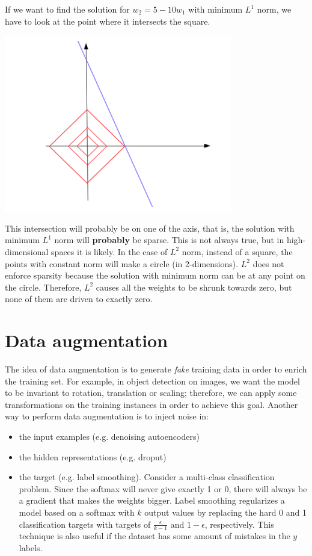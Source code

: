 If we want to find the solution for $w_2 = 5 - 10 w_1$ with minimum $L^1$ norm, we have to look at the point where it intersects the square.
\begin{center}
    \includegraphics[scale=0.7]{images/l1 sparse.png}
\end{center}
This intersection will probably be on one of the axis, that is, the solution with minimum $L^1$ norm will \textbf{probably} be sparse. This is not always true, but in high-dimensional spaces it is likely.\newline\newline
In the case of $L^2$ norm, instead of a square, the points with constant norm will make a circle (in 2-dimensions). $L^2$ does not enforce sparsity because the solution with minimum norm can be at any point on the circle. Therefore,  $L^2$ causes all the weights to be shrunk towards zero, but none of them are driven to exactly zero.

\section{Data augmentation}
The idea of data augmentation is to generate \textit{fake} training data in order to enrich the training set. For example, in object detection on images, we want the model to be invariant to rotation, translation or scaling; therefore, we can apply some transformations on the training instances in order to achieve this goal.\newline\newline
Another way to perform data augmentation is to inject noise in:
\begin{itemize}
    \item the input examples (e.g. denoising autoencoders)
    \item the hidden representations (e.g. droput)
    \item the target (e.g. label smoothing). Consider a multi-class classification problem. Since the softmax will never give exactly 1 or 0, there will always be a gradient that makes the weights bigger. Label smoothing regularizes a model based on a softmax with $k$ output values by replacing the hard 0 and 1 classification targets with targets of $\frac{\epsilon}{k - 1}$ and $1 - \epsilon$, respectively.\newline\newline
    This technique is also useful if the dataset has some amount of mistakes in the $y$ labels.
\end{itemize}

